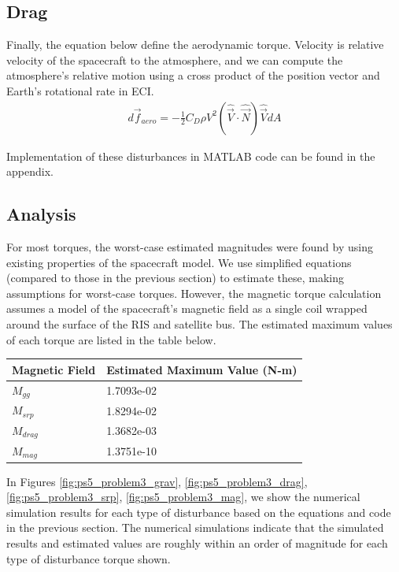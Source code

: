 \subsection{Drag}
Finally, the equation below define the aerodynamic torque. Velocity is relative velocity of the spacecraft to the atmosphere, and we can compute the atmosphere's relative motion using a cross product of the position vector and Earth's rotational rate in ECI.
\begin{align*}
    d \Vec{f}_{aero} = - \frac{1}{2} C_D \rho V^2 (\hat{\Vec{V}} \cdot \hat{\Vec{N}}) \hat{\Vec{V}} dA
\end{align*}

Implementation of these disturbances in MATLAB code can be found in the appendix.

\subsection{Analysis}
For most torques, the worst-case estimated magnitudes were found by using existing properties of the spacecraft model. We use simplified equations (compared to those in the previous section) to estimate these, making assumptions for worst-case torques. However, the magnetic torque calculation assumes a model of the spacecraft's magnetic field as a single coil wrapped around the surface of the RIS and satellite bus. The estimated maximum values of each torque are listed in the table below.

\begin{table}[H]
\centering
\begin{tabular}{l|l} 

Magnetic Field & Estimated Maximum Value (N-m)  \\ 
\hline
$M_{gg}$          & 1.7093e-02                  \\ 
\hline
$M_{srp}$         & 1.8294e-02                  \\ 
\hline
$M_{drag}$        & 1.3682e-03                  \\ 
\hline
$M_{mag}$         & 1.3751e-10                  \\
\end{tabular}
\end{table}

In Figures \ref{fig:ps5_problem3_grav}, \ref{fig:ps5_problem3_drag}, \ref{fig:ps5_problem3_srp}, \ref{fig:ps5_problem3_mag}, we show the numerical simulation results for each type of disturbance based on the equations and code in the previous section. The numerical simulations indicate that the simulated results and estimated values are roughly within an order of magnitude for each type of disturbance torque shown.

